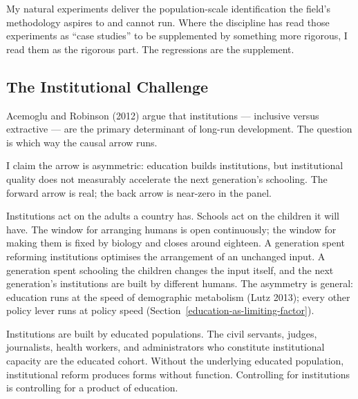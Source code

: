 \documentclass[12pt,letterpaper]{article}
\begin{document}
My natural experiments deliver the population-scale
identification the field's methodology aspires to and cannot run. Where the discipline has
read those experiments as ``case studies'' to be supplemented by
something more rigorous, I read them as the rigorous part.
The regressions are the supplement.

\subsection{The Institutional Challenge}\label{the-institutional-challenge}

Acemoglu and Robinson (2012) argue that institutions --- inclusive versus extractive --- are the primary determinant of long-run development. The question is which way the causal arrow runs.

I claim the arrow is asymmetric: education builds institutions, but institutional quality does not measurably accelerate the next generation's schooling. The forward arrow is real; the back arrow is near-zero in the panel.

Institutions act on the adults a country has. Schools act on the children it will have. The window for arranging humans is open continuously; the window for making them is fixed by biology and closes around eighteen. A generation spent reforming institutions optimises the arrangement of an unchanged input. A generation spent schooling the children changes the input itself, and the next generation's institutions are built by different humans. The asymmetry is general: education runs at the speed of demographic metabolism (Lutz 2013); every other policy lever runs at policy speed (Section~\ref{education-as-limiting-factor}).

Institutions are built by educated populations. The civil servants, judges, journalists, health workers, and administrators who constitute institutional capacity are the educated cohort. Without the underlying educated population, institutional reform produces forms without function. Controlling for institutions is controlling for a product of education.
\end{document}
